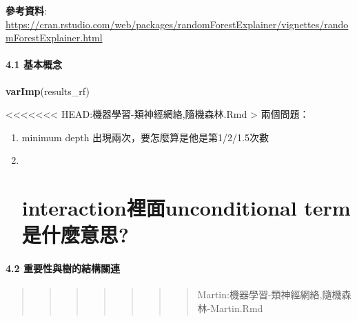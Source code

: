 \documentclass[]{book}
\newenvironment{Shaded}{\begin{snugshade}}{\end{snugshade}}
\newcommand{\KeywordTok}[1]{\textcolor[rgb]{0.13,0.29,0.53}{\textbf{#1}}}
\newcommand{\NormalTok}[1]{#1}
\begin{document}
\textbf{參考資料}: \url{https://cran.rstudio.com/web/packages/randomForestExplainer/vignettes/randomForestExplainer.html}

\subsubsection{4.1 基本概念}

\begin{Shaded}
\begin{Highlighting}[]
\KeywordTok{varImp}\NormalTok{(results_rf)}
\end{Highlighting}
\end{Shaded}

\textless{}\textless{}\textless{}\textless{}\textless{}\textless{}\textless{} HEAD:機器學習-類神經網絡,隨機森林.Rmd
\textgreater{} 兩個問題：

\begin{enumerate}
\def\labelenumi{\arabic{enumi}.}
\item
  minimum depth 出現兩次，要怎麼算是他是第1/2/1.5次數
\item ~
  \hypertarget{interactionunconditional-term}{%
  \chapter{interaction裡面unconditional term是什麼意思?}\label{interactionunconditional-term}}
\end{enumerate}

\subsubsection{4.2 重要性與樹的結構關連}

\begin{quote}
\begin{quote}
\begin{quote}
\begin{quote}
\begin{quote}
\begin{quote}
\begin{quote}
Martin:機器學習-類神經網絡,隨機森林-Martin.Rmd
\end{quote}
\end{quote}
\end{quote}
\end{quote}
\end{quote}
\end{quote}
\end{quote}
\end{document}
